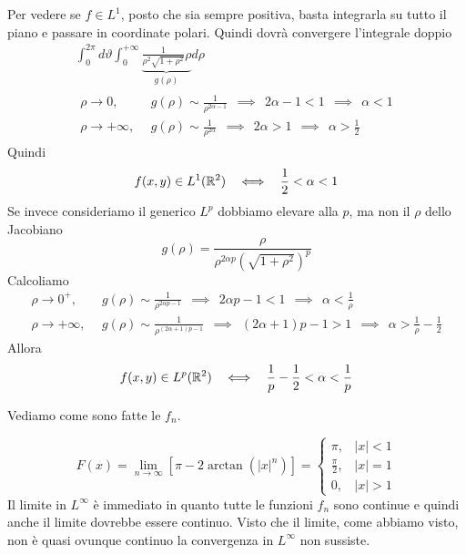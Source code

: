 Per vedere se $f\in L^{1}$, posto che sia sempre positiva, basta integrarla su tutto il piano e passare in coordinate polari. Quindi dovrà convergere l'integrale doppio
\begin{gather*}
\int^{2\pi}_{0} d\vartheta \int^{+ \infty}_{0}\underbrace{\frac{1}{\rho^{2}\sqrt{1 + \rho^{2}}} \rho}_{g(\rho)} d\rho \\
\begin{aligned}
\rho \rightarrow 0, & \ \ g(\rho)\sim \frac{1}{\rho^{2\alpha - 1}} \ \ \implies \ \ 2\alpha - 1 < 1\ \ \implies \ \ \alpha < 1\\
\rho \rightarrow + \infty, & \ \ g(\rho)\sim \frac{1}{\rho^{2\alpha}} \ \ \implies \ \ 2\alpha  > 1\ \ \implies \ \ \alpha  > \frac{1}{2}
\end{aligned}
\end{gather*}
Quindi
\begin{equation*}
f(x, y)\in L^{1} (\RR^{2})\ \ \iff \ \ \frac{1}{2} < \alpha < 1
\end{equation*}
Se invece consideriamo il generico $L^{p}$ dobbiamo elevare alla $p$, ma non il $\rho $ dello Jacobiano
\begin{equation*}
g(\rho) = \frac{\rho}{\rho^{2\alpha p}\left(\sqrt{1 + \rho^{2}}\right)^{p}}
\end{equation*}
Calcoliamo
\begin{equation*}
\begin{aligned}
\rho \rightarrow 0^{+}, & \ \ g(\rho)\sim \frac{1}{\rho^{2\alpha p - 1}} \ \ \implies \ \ 2\alpha p - 1 < 1\ \ \implies \ \ \alpha < \frac{1}{\rho}\\
\rho \rightarrow + \infty, & \ \ g(\rho)\sim \frac{1}{\rho^{(2\alpha + 1)p - 1}} \ \ \implies \ \ (2\alpha + 1)p - 1 > 1\ \ \implies \ \ \alpha  > \frac{1}{\rho} - \frac{1}{2}
\end{aligned}
\end{equation*}
Allora
\begin{equation*}
f(x, y)\in L^{p} (\RR^{2})\ \ \iff \ \ \frac{1}{p} - \frac{1}{2} < \alpha < \frac{1}{p}
\end{equation*}
\Soluzione

Vediamo come sono fatte le $f_{n}$.

\begin{equation*}
F(x) = \lim_{n\rightarrow \infty}\left[ \pi - 2\arctan (|x|^{n})\right] = 
\begin{cases}
\pi, & |x| < 1\\
\frac{\pi}{2}, & |x| = 1\\
0, & |x| > 1
\end{cases}
\end{equation*}
Il limite in $L^{\infty}$ è immediato in quanto tutte le funzioni $f_{n}$ sono continue e quindi anche il limite dovrebbe essere continuo. Visto che il limite, come abbiamo visto, non è quasi ovunque continuo la convergenza in $L^{\infty}$ non sussiste.

